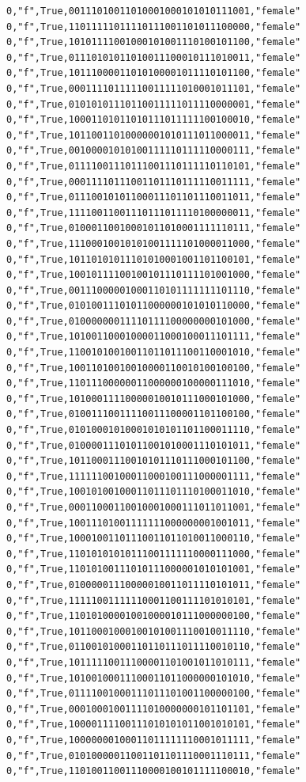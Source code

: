 \documentclass[authoryearcitations]{UoYCSproject}
\begin{document}
\begin{framed}
\begin{verbatim}
0,"f",True,00111010011010001000101010111001,"female"
0,"f",True,11011111011110111001101011100000,"female"
0,"f",True,10101111001000101001110100101100,"female"
0,"f",True,01110101011010011100010111010011,"female"
0,"f",True,10111000011010100001011110101100,"female"
0,"f",True,00011110111110011111010001011101,"female"
0,"f",True,01010101110110011111011110000001,"female"
0,"f",True,10001101011010111011111100100010,"female"
0,"f",True,10110011010000001010111011000011,"female"
0,"f",True,00100001010100111110111110000111,"female"
0,"f",True,01111001110111001110111110110101,"female"
0,"f",True,00011110111001101110111110011111,"female"
0,"f",True,01110010101100011101101110011011,"female"
0,"f",True,11110011001110111011110100000011,"female"
0,"f",True,01000110010001011010001111110111,"female"
0,"f",True,11100010010101001111101000011000,"female"
0,"f",True,10110101011101010001001101100101,"female"
0,"f",True,10010111100100101110111101001000,"female"
0,"f",True,00111000001000110101111111101110,"female"
0,"f",True,01010011101011000000101010110000,"female"
0,"f",True,01000000011110111100000000101000,"female"
0,"f",True,10100110001000011000100011101111,"female"
0,"f",True,11001010010011011011100110001010,"female"
0,"f",True,10011010010010000110010100100100,"female"
0,"f",True,11011100000011000000100000111010,"female"
0,"f",True,10100011110000010010111000101000,"female"
0,"f",True,01001110011110011100001101100100,"female"
0,"f",True,01010001010001010101101100011110,"female"
0,"f",True,01000011101011001010001110101011,"female"
0,"f",True,10110001110010101110111000101100,"female"
0,"f",True,11111100100011000100111000001111,"female"
0,"f",True,10010100100011011101110100011010,"female"
0,"f",True,00011000110010001000111011011001,"female"
0,"f",True,10011101001111111000000001001011,"female"
0,"f",True,10001001101110011011010011000110,"female"
0,"f",True,11010101010111001111110000111000,"female"
0,"f",True,11010100111010111000001010101001,"female"
0,"f",True,01000001110000010011011110101011,"female"
0,"f",True,11111001111110001100111101010101,"female"
0,"f",True,11010100001001000010111000000100,"female"
0,"f",True,10110001000100101001110010011110,"female"
0,"f",True,01100101000110110111011110010110,"female"
0,"f",True,10111110011100001101001011010111,"female"
0,"f",True,10100100011100011011000000101010,"female"
0,"f",True,01111001000111011101001100000100,"female"
0,"f",True,00010001001111010000000101101101,"female"
0,"f",True,10000111100111010101011001010101,"female"
0,"f",True,10000000100011011111110001011111,"female"
0,"f",True,01010000011001101101110001110111,"female"
0,"f",True,11010011001110000100101111100010,"female"

\end{verbatim}
\end{framed}
\end{document}
